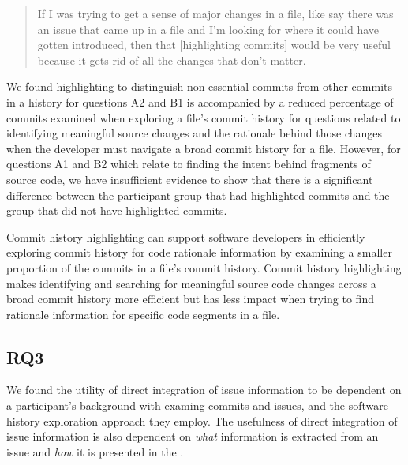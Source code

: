 \begin{quote}
  If I was trying to get a sense of major changes in a file, like say there was an issue that came up in a file and I’m looking for where it could have gotten introduced, 
  then that [highlighting commits] would be very useful because it gets rid of all the changes that don’t matter. 
\end{quote}

We found highlighting to distinguish non-essential commits from other commits in a history
for questions A2 and B1 is accompanied by a reduced percentage of commits examined when exploring a file's commit history 
for questions related to identifying meaningful source changes 
and the rationale behind those changes when the developer must navigate a broad commit history for a file. 
However, for questions A1 and B2 which relate to finding the intent behind fragments of source code,
we have insufficient evidence to show that there is a significant difference
between the participant group that had highlighted commits and the group that did not have highlighted commits.

\begin{summary}[RQ2]
  Commit history highlighting can support software developers in efficiently 
  exploring commit history for code rationale information 
  by examining a smaller proportion of the commits in a file's commit history.
  Commit history highlighting makes identifying and searching for meaningful source code changes 
  across a broad commit history more efficient but has less impact when trying to find rationale information for specific code segments in a file.
\end{summary}


\subsection{RQ3}
\label{subsec:RQ3}


We found the utility of direct integration of issue information 
to be dependent on a participant's background with examing commits and issues,
and the software history exploration approach they employ.
The usefulness of direct integration of issue information is also dependent on 
\emph{what} information is extracted from an issue and \emph{how} it is presented in the .


